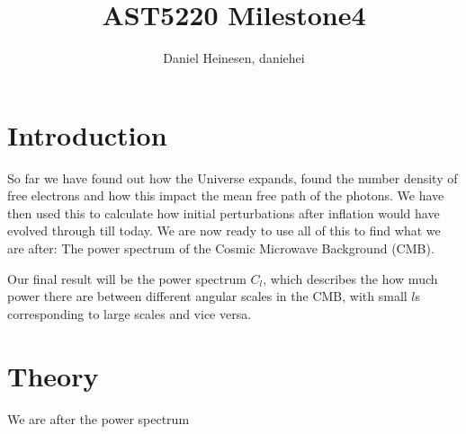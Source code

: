 \documentclass[a4paper,norsk, 10pt]{article}
\title{AST5220 Milestone4}
\author{Daniel Heinesen, daniehei}
\begin{document}
\maketitle
\section{Introduction}
So far we have found out how the Universe expands, found the number density of free electrons and how this impact the mean free path of the photons. We have then used this to calculate how initial perturbations after inflation would have evolved through till today. We are now ready to use all of this to find what we are after: The power spectrum of the Cosmic Microwave Background (CMB). 

Our final result will be the power spectrum $C_l$, which describes the how much power there are between different angular scales in the CMB, with small $l$s corresponding to large scales and vice versa.

\section{Theory}
We are after the power spectrum
\end{document}
